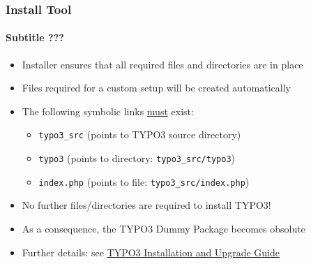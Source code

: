 
\begin{frame}[fragile]

	\frametitle{Install Tool}
	\framesubtitle{Subtitle ???} %

	\begin{itemize}
		\item Installer ensures that all required files and directories are in place
		\item Files required for a custom setup will be created automatically
		\item The following symbolic links \underline{must} exist:

		\begin{itemize}
			\item \texttt{typo3\_src}	\tabto{2cm} (points to TYPO3 source directory)
			\item \texttt{typo3}		\tabto{2cm} (points to directory: \texttt{typo3\_src/typo3})
			\item \texttt{index.php}	\tabto{2cm} (points to file: \texttt{typo3\_src/index.php})
		\end{itemize}

		\item No further files/directories are required to install TYPO3!
		\item As a consequence, the TYPO3 Dummy Package becomes obsolute
		\item Further details: see \href{http://docs.typo3.org/typo3cms/InstallationGuide}{TYPO3 Installation and Upgrade Guide}

	\end{itemize}

\end{frame}



